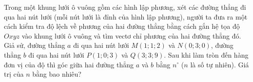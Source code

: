 \begin{bt}%
	Trong một khung lưới ô vuông gồm các hình lập phương,  xét các đường thẳng đi qua hai nút lưới (mỗi nút lưới là đỉnh của hình lập phương), người ta đưa ra một cách kiểm tra độ lệch về phương của hai đường thẳng bằng cách gắn hệ tọa độ $Oxyz$ vào khung lưới ô vuông và tìm vectơ chỉ phương của hai đường thẳng đó. Giả sử, đường thẳng $a$ đi qua hai nút lưới $M(1; 1; 2)$ và $N(0; 3; 0)$, đường thẳng $b$ đi qua hai nút lưới $P(1; 0; 3)$ và $Q(3; 3; 9)$. Sau khi làm tròn đến hàng đơn vị của độ thì góc giữa hai đường thẳng $a$ và $b$ bằng $n^\circ$ ($n$ là số tự nhiên). Giá trị của $n$ bằng bao nhiêu?
\end{bt}

